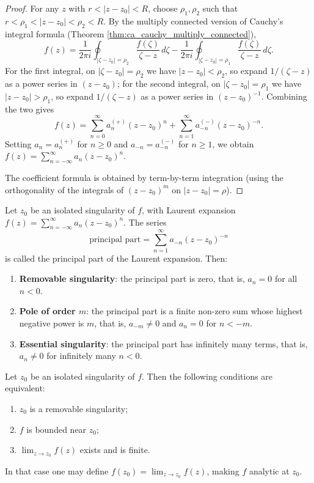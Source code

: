 \begin{proof}
For any $z$ with $r < |z - z_0| < R$, choose $\rho_1, \rho_2$ such that $r < \rho_1 < |z - z_0| < \rho_2 < R$. By the multiply connected version of Cauchy's integral formula (Theorem \ref{thm:ca_cauchy_multiply_connected}),
\[
f(z) = \frac{1}{2\pi i} \oint_{|\zeta - z_0| = \rho_2} \frac{f(\zeta)}{\zeta - z} \, d\zeta - \frac{1}{2\pi i} \oint_{|\zeta - z_0| = \rho_1} \frac{f(\zeta)}{\zeta - z} \, d\zeta.
\]
For the first integral, on $|\zeta - z_0| = \rho_2$ we have $|z - z_0| < \rho_2$, so expand $1/(\zeta - z)$ as a power series in $(z - z_0)$; for the second integral, on $|\zeta - z_0| = \rho_1$ we have $|z - z_0| > \rho_1$, so expand $1/(\zeta - z)$ as a power series in $(z - z_0)^{-1}$. Combining the two gives
\[
f(z) = \sum_{n=0}^{\infty} a_n^{(+)} (z - z_0)^n + \sum_{n=1}^{\infty} a_{-n}^{(-)} (z - z_0)^{-n}.
\]
Setting $a_n = a_n^{(+)}$ for $n \ge 0$ and $a_{-n} = a_{-n}^{(-)}$ for $n \ge 1$, we obtain $f(z) = \sum_{n=-\infty}^{\infty} a_n (z - z_0)^n$.

The coefficient formula is obtained by term-by-term integration (using the orthogonality of the integrals of $(z - z_0)^m$ on $|z - z_0| = \rho$).
\end{proof}

\begin{definition}\label{def:ca_singularity_types}
Let $z_0$ be an isolated singularity of $f$, with Laurent expansion $f(z) = \sum_{n=-\infty}^{\infty} a_n (z - z_0)^n$. The series
\[
\text{principal part} = \sum_{n=1}^{\infty} a_{-n} (z - z_0)^{-n}
\]
is called the principal part of the Laurent expansion. Then:
\begin{enumerate}[label=(\roman*)]
    \item \textbf{Removable singularity}: the principal part is zero, that is, $a_n = 0$ for all $n < 0$.
    \item \textbf{Pole of order $m$}: the principal part is a finite non-zero sum whose highest negative power is $m$, that is, $a_{-m} \neq 0$ and $a_n = 0$ for $n < -m$.
    \item \textbf{Essential singularity}: the principal part has infinitely many terms, that is, $a_n \neq 0$ for infinitely many $n < 0$.
\end{enumerate}
\end{definition}

\begin{theorem}\label{thm:ca_removable_singularity}
Let $z_0$ be an isolated singularity of $f$. Then the following conditions are equivalent:
\begin{enumerate}[label=(\roman*)]
    \item $z_0$ is a removable singularity;
    \item $f$ is bounded near $z_0$;
    \item $\lim_{z \to z_0} f(z)$ exists and is finite.
\end{enumerate}
In that case one may define $f(z_0) = \lim_{z \to z_0} f(z)$, making $f$ analytic at $z_0$.
\end{theorem}


